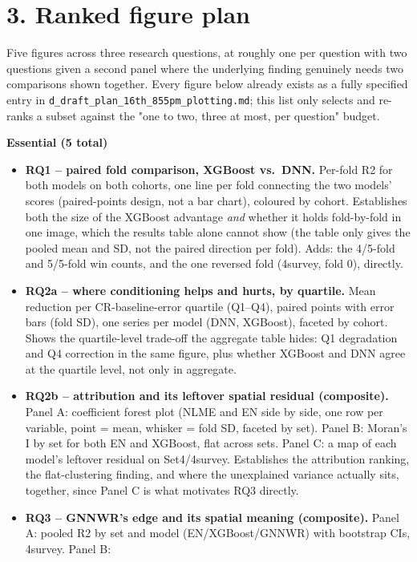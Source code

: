 \documentclass[11pt,a4paper]{report}
\begin{document}
\section*{3. Ranked figure plan}

Five figures across three research questions, at roughly one per question with two
questions given a second panel where the underlying finding genuinely needs two
comparisons shown together. Every figure below already exists as a fully specified
entry in \texttt{d\_draft\_plan\_16th\_855pm\_plotting.md}; this list only selects and
re-ranks a subset against the "one to two, three at most, per question" budget.

\textbf{Essential (5 total)}

\begin{itemize}
\item \textbf{RQ1 -- paired fold comparison, XGBoost vs.\ DNN.} Per-fold R2 for both
  models on both cohorts, one line per fold connecting the two models' scores
  (paired-points design, not a bar chart), coloured by cohort. Establishes both the
  size of the XGBoost advantage \emph{and} whether it holds fold-by-fold in one image,
  which the results table alone cannot show (the table only gives the pooled mean and
  SD, not the paired direction per fold). Adds: the 4/5-fold and 5/5-fold win counts,
  and the one reversed fold (4survey, fold 0), directly.
\item \textbf{RQ2a -- where conditioning helps and hurts, by quartile.} Mean
  reduction per CR-baseline-error quartile (Q1--Q4), paired points with error bars
  (fold SD), one series per model (DNN, XGBoost), faceted by cohort. Shows the
  quartile-level trade-off the aggregate table hides: Q1 degradation and Q4 correction
  in the same figure, plus whether XGBoost and DNN agree at the quartile level, not
  only in aggregate.
\item \textbf{RQ2b -- attribution and its leftover spatial residual (composite).}
  Panel A: coefficient forest plot (NLME and EN side by side, one row per variable,
  point = mean, whisker = fold SD, faceted by set). Panel B: Moran's I by set for both
  EN and XGBoost, flat across sets. Panel C: a map of each model's leftover residual
  on Set4/4survey. Establishes the attribution ranking, the flat-clustering finding,
  and where the unexplained variance actually sits, together, since Panel C is what
  motivates RQ3 directly.
\item \textbf{RQ3 -- GNNWR's edge and its spatial meaning (composite).} Panel A:
  pooled R2 by set and model (EN/XGBoost/GNNWR) with bootstrap CIs, 4survey. Panel B:

\end{itemize}
\end{document}
